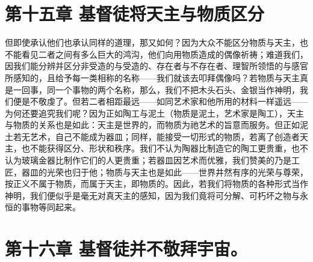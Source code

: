 
\section{第十五章 基督徒将天主与物质区分}

但即使承认他们也承认同样的道理，那又如何？因为大众不能区分物质与天主，也不能看见二者之间有多么巨大的鸿沟，他们向用物质造成的偶像祈祷；难道我们，因我们能分辨并区分非受造的与受造的、存在者与不存在者、理智所领悟的与感官所感知的，且给予每一类相称的名称——我们就该去叩拜偶像吗？若物质与天主真是一回事，同一个事物的两个名称，那么，我们不把木头石头、金银当作神明，我们便是不敬虔了。但若二者相距最远——如同艺术家和他所用的材料一样遥远——为何还要追究我们呢？因为正如陶工与泥土（物质是泥土，艺术家是陶工），天主与物质的关系也是如此：天主是世界的，而物质为祂艺术的旨意而服务。但正如泥土若无艺术，自己不能成为器皿；同样，能接受一切形式的物质，若离了创造者天主，也不能获得区分、形状和秩序。我们不认为陶器比制造它的陶工更贵重，也不认为玻璃金器比制作它们的人更贵重；若器皿因艺术而优雅，我们赞美的乃是工匠，器皿的光荣也归于他；物质与天主也是如此——世界井然有序的光荣与尊荣，按正义不属于物质，而属于天主，即物质的。因此，若我们将物质的各种形式当作神明，我们便似乎是毫无对真天主的感知，因为我们竟将可分解、可朽坏之物与永恒的事物等同起来。\par


\section{第十六章 基督徒并不敬拜宇宙。}

